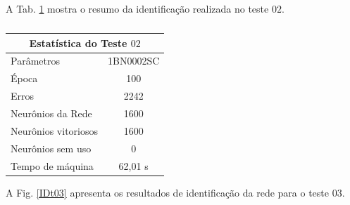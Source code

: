 A Tab. \ref{Estatistica do teste $02$} mostra o resumo da identificação realizada no teste $02$.

\begin{table}[H]
	\centering
	\caption{}
	\label{Estatistica do teste $02$}
	\begin{tabular}{@{}lc@{}}
		\toprule
		\multicolumn{2}{c}{Estatística do Teste $02$}         \\ \midrule
		Parâmetros                  & 1BN0002SC \\
		Época                       & 100       \\
		Erros                       & 2242       \\
		Neurônios da Rede           & 1600       \\
		Neurônios vitoriosos        & 1600       \\
		Neurônios sem uso           & 0         \\
		Tempo de máquina            & 62,01 s   \\ \bottomrule
	\end{tabular}
\end{table} 

A Fig. \ref{IDt03} apresenta os resultados de identificação da rede para o teste $03$.

